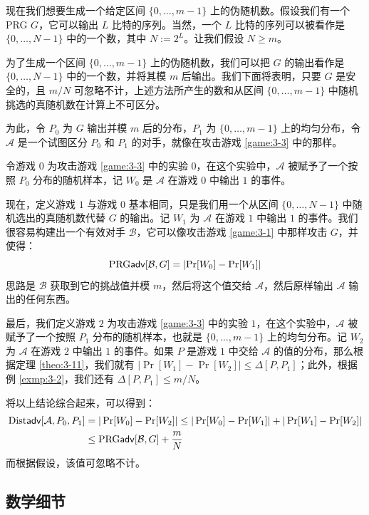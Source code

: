 \begin{example}
现在我们想要生成一个给定区间 $\{0,\dots,m-1\}$ 上的伪随机数。假设我们有一个PRG $G$，它可以输出 $L$ 比特的序列。当然，一个 $L$ 比特的序列可以被看作是 $\{0,\dots,N-1\}$ 中的一个数，其中 $N:=2^L$。让我们假设 $N\geq m$。

为了生成一个区间 $\{0,\dots,m-1\}$ 上的伪随机数，我们可以把 $G$ 的输出看作是 $\{0,\dots,N-1\}$ 中的一个数，并将其模 $m$ 后输出。我们下面将表明，只要 $G$ 是安全的，且 ${m}/{N}$ 可忽略不计，上述方法所产生的数和从区间 $\{0,\dots,m-1\}$ 中随机挑选的真随机数在计算上不可区分。

为此，令 $P_0$ 为 $G$ 输出并模 $m$ 后的分布，$P_1$ 为 $\{0,\dots,m-1\}$ 上的均匀分布，令 $\mathcal A$ 是一个试图区分 $P_0$ 和 $P_1$ 的对手，就像在攻击游戏 \ref{game:3-3} 中的那样。

令游戏 $0$ 为攻击游戏 \ref{game:3-3} 中的实验 $0$，在这个实验中，$\mathcal A$ 被赋予了一个按照 $P_0$ 分布的随机样本，记 $W_0$ 是 $\mathcal A$ 在游戏 $0$ 中输出 $1$ 的事件。

现在，定义游戏 $1$ 与游戏 $0$ 基本相同，只是我们用一个从区间 $\{0,\dots,N-1\}$ 中随机选出的真随机数代替 $G$ 的输出。记 $W_1$ 为 $\mathcal A$ 在游戏 $1$ 中输出 $1$ 的事件。我们很容易构建出一个有效对手 $\mathcal{B}$，它可以像攻击游戏 \ref{game:3-1} 中那样攻击 $G$，并使得：
\[
{\rm PRG\mathsf{adv}}[\mathcal{B},G]=|{\rm Pr}[W_0]-{\rm Pr}[W_1]|
\]
思路是 $\mathcal{B}$ 获取到它的挑战值并模 $m$，然后将这个值交给 $\mathcal A$，然后原样输出 $\mathcal A$ 输出的任何东西。

最后，我们定义游戏 $2$ 为攻击游戏 \ref{game:3-3} 中的实验 $1$，在这个实验中，$\mathcal A$ 被赋予了一个按照 $P_1$ 分布的随机样本，也就是 $\{0,\dots,m-1\}$ 上的均匀分布。记 $W_2$ 为 $\mathcal A$ 在游戏 $2$ 中输出 $1$ 的事件。如果 $P$ 是游戏 $1$ 中交给 $\mathcal A$ 的值的分布，那么根据定理 \ref	{theo:3-11}，我们就有 $|\Pr[W_1]-\Pr[W_2]|\leq\Delta[P,P_1]$；此外，根据例 \ref{exmp:3-2}，我们还有 $\Delta[P,P_1]\leq{m}/{N}$。

将以上结论综合起来，可以得到：
\[
\begin{aligned}
{\rm Dist\mathsf{adv}}[\mathcal{A},P_0,P_1]
&=|\Pr[W_0]-\Pr[W_2]|\leq|\Pr[W_0]-\Pr[W_1]|+|\Pr[W_1]-\Pr[W_2]|\\
&\leq{\rm PRG\mathsf{adv}}[\mathcal{B},G]+\frac{m}{N}
\end{aligned}
\]
而根据假设，该值可忽略不计。
\end{example}

\subsection{数学细节}

